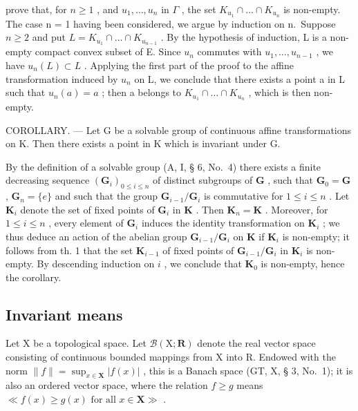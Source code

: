 prove that, for \(n \geqslant 1\) , and \(u_{1}, \ldots, u_{n}\) in \(\Gamma\) , the set \(K_{u_{1}} \cap \ldots \cap K_{u_{n}}\) is non-empty. The case n = 1 having been considered, we argue by induction on n.~Suppose \(n \geqslant 2\) and put \(L = K_{u_{1}} \cap \ldots \cap K_{u_{n-1}}\) . By the hypothesis of induction, L is a non-empty compact convex subset of E. Since \(u_{n}\) commutes with \(u_{1}, \ldots, u_{n-1}\) , we have \(u_{n}(L) \subset L\) . Applying the first part of the proof to the affine transformation induced by \(u_{n}\) on L, we conclude that there exists a point a in L such that \(u_{n}(a) = a\) ; then a belongs to \(K_{u_{1}} \cap \ldots \cap K_{u_{n}}\) , which is then non-empty.

COROLLARY. --- Let G be a solvable group of continuous affine transformations on K. Then there exists a point in K which is invariant under G.

By the definition of a solvable group (A, I, § 6, No.~4) there exists a finite decreasing sequence \((\mathbf{G}_i)_{0\leqslant i\leqslant n}\) of distinct subgroups of \(\mathbf{G}\) , such that \(\mathbf{G}_0 = \mathbf{G}\) , \(\mathbf{G}_n = \{e\}\) and such that the group \(\mathbf{G}_{i - 1} / \mathbf{G}_i\) is commutative for \(1\leqslant i\leqslant n\) . Let \(\mathbf{K}_i\) denote the set of fixed points of \(\mathbf{G}_i\) in \(\mathbf{K}\) . Then \(\mathbf{K}_n = \mathbf{K}\) . Moreover, for \(1\leqslant i\leqslant n\) , every element of \(\mathbf{G}_i\) induces the identity transformation on \(\mathbf{K}_i\) ; we thus deduce an action of the abelian group \(\mathbf{G}_{i - 1} / \mathbf{G}_i\) on \(\mathbf{K}\) if \(\mathbf{K}_i\) is non-empty; it follows from th. 1 that the set \(\mathbf{K}_{i - 1}\) of fixed points of \(\mathbf{G}_{i - 1} / \mathbf{G}_i\) in \(\mathbf{K}_i\) is non-empty. By descending induction on \(i\) , we conclude that \(\mathbf{K}_0\) is non-empty, hence the corollary.

\subsection{Invariant means}

Let X be a topological space. Let \(\mathcal{B}(\mathrm{X};\mathbf{R})\) denote the real vector space consisting of continuous bounded mappings from X into R. Endowed with the norm \(\| f\| = \sup_{x\in \mathbf{X}}|f(x)|\) , this is a Banach space (GT, X, § 3, No.~1); it is also an ordered vector space, where the relation \(f\geqslant g\) means \(\ll f(x)\geqslant g(x) \text{ for all } x\in \mathbf{X}\gg\) .

